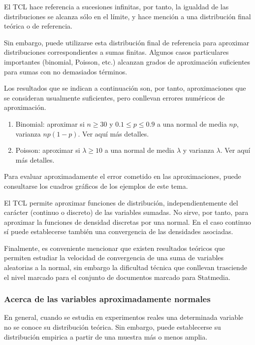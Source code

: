 \documentclass[
]{article}
\begin{document}
El TCL hace referencia a sucesiones infinitas, por tanto, la igualdad de las distribuciones se alcanza sólo en el límite, y hace mención a una distribución final teórica o de referencia.

Sin embargo, puede utilizarse esta distribución final de referencia para aproximar distribuciones correspondientes a sumas finitas. Algunos casos particulares importantes (binomial, Poisson, etc.) alcanzan grados de aproximación suficientes para sumas con no demasiados términos.

Los resultados que se indican a continuación son, por tanto, aproximaciones que se consideran usualmente suficientes, pero conllevan errores numéricos de aproximación.

\begin{enumerate}
\def\labelenumi{\arabic{enumi}.}
\item
  Binomial: aproximar si \(n \geq 30\) y \(0.1 \leq p \leq 0.9\) a una normal de media \(n p\), varianza \(n p(1-p)\). Ver aquí más detalles.
\item
  Poisson: aproximar si \(\lambda \geq 10\) a una normal de media \(\lambda\) y varianza \(\lambda\). Ver aquí más detalles.
\end{enumerate}

Para evaluar aproximadamente el error cometido en las aproximaciones, puede consultarse los cuadros gráficos de los ejemplos de este tema.

El TCL permite aproximar funciones de distribución, independientemente del carácter (continuo o discreto) de las variables sumadas. No sirve, por tanto, para aproximar la funciones de densidad discretas por una normal. En el caso continuo sí puede establecerse también una convergencia de las densidades asociadas.

Finalmente, es conveniente mencionar que existen resultados teóricos que permiten estudiar la velocidad de convergencia de una suma de variables aleatorias a la normal, sin embargo la dificultad técnica que conllevan trasciende el nivel marcado para el conjunto de documentos marcado para Statmedia.

\subsubsection{Acerca de las variables aproximadamente normales}\label{acerca-de-las-variables-aproximadamente-normales}

En general, cuando se estudia en experimentos reales una determinada variable no se conoce su distribución teórica. Sin embargo, puede establecerse su distribución empirica a partir de una muestra más o menos amplia.
\end{document}

